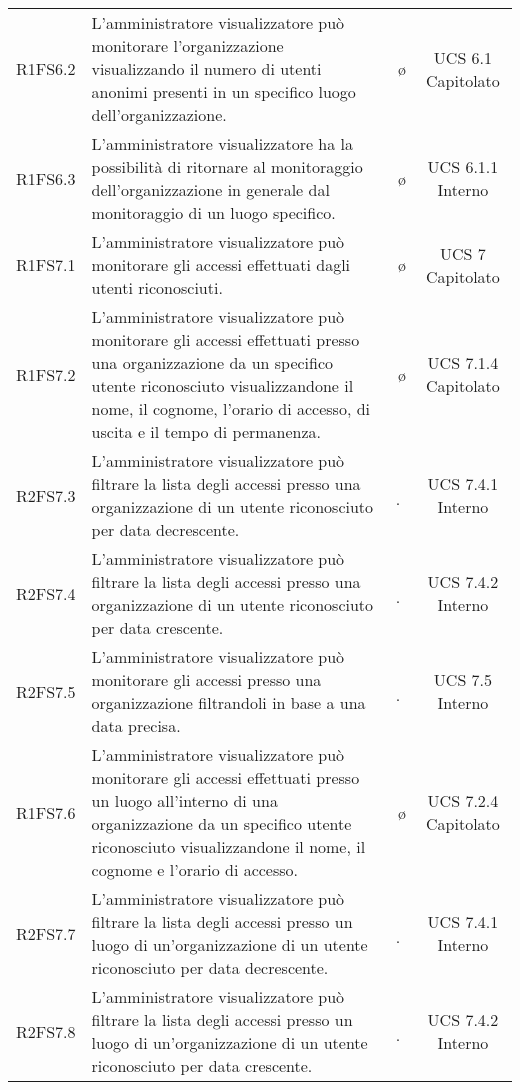 {\begin{longtable}{ c C{6.5cm} c c}
R1FS6.2 & L'amministratore visualizzatore può monitorare l'organizzazione visualizzando il numero di utenti anonimi presenti in un specifico luogo dell'organizzazione. & \o & UCS 6.1 Capitolato\\

R1FS6.3 & L'amministratore visualizzatore ha la possibilità di ritornare al monitoraggio dell'organizzazione in generale dal monitoraggio di un luogo specifico. & \o & UCS 6.1.1 Interno\\

R1FS7.1 & L'amministratore visualizzatore può monitorare gli accessi effettuati dagli utenti riconosciuti. & \o & UCS 7 Capitolato\\

R1FS7.2 & L'amministratore visualizzatore può monitorare gli accessi effettuati presso una organizzazione da un specifico utente riconosciuto visualizzandone il nome, il cognome, l'orario di accesso, di uscita e il tempo di permanenza. & \o & UCS 7.1.4 Capitolato\\

R2FS7.3 & L’amministratore visualizzatore può filtrare la lista degli accessi presso una organizzazione di un utente riconosciuto per data decrescente. & \d & UCS 7.4.1 Interno \\

R2FS7.4 & L’amministratore visualizzatore può filtrare la lista degli accessi presso una organizzazione  di un utente riconosciuto per data crescente. & \d & UCS 7.4.2 Interno \\

R2FS7.5 & L'amministratore visualizzatore può monitorare gli accessi presso una organizzazione filtrandoli in base a una data precisa. & \d & UCS 7.5 Interno\\

R1FS7.6 & L'amministratore visualizzatore può monitorare gli accessi effettuati presso un luogo all'interno di una organizzazione da un specifico utente riconosciuto visualizzandone il nome, il cognome e l'orario di accesso. & \o & UCS 7.2.4 Capitolato\\

R2FS7.7 & L’amministratore visualizzatore può filtrare la lista degli accessi presso un luogo di un'organizzazione di un utente riconosciuto per data decrescente. & \d & UCS 7.4.1 Interno \\

R2FS7.8 & L’amministratore visualizzatore può filtrare la lista degli accessi presso un luogo di un'organizzazione di un utente riconosciuto per data crescente. & \d & UCS 7.4.2 Interno \\


\end{longtable}}
